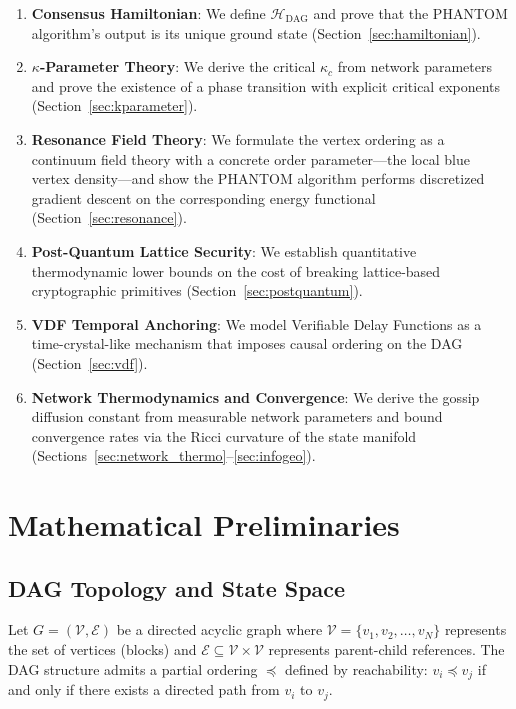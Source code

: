 \documentclass[12pt,a4paper,twocolumn]{article}
\newcommand{\Hdag}{\mathcal{H}_{\mathrm{DAG}}}
\newcommand{\kparam}{\kappa}
\newcommand{\vertexset}{\mathcal{V}}
\newcommand{\edgeset}{\mathcal{E}}
\begin{document}
\begin{enumerate}[leftmargin=*,itemsep=2pt]
\item \textbf{Consensus Hamiltonian}: We define $\Hdag$ and prove that the PHANTOM algorithm's output is its unique ground state (Section~\ref{sec:hamiltonian}).

\item \textbf{$\kparam$-Parameter Theory}: We derive the critical $\kparam_c$ from network parameters and prove the existence of a phase transition with explicit critical exponents (Section~\ref{sec:kparameter}).

\item \textbf{Resonance Field Theory}: We formulate the vertex ordering as a continuum field theory with a concrete order parameter---the local blue vertex density---and show the PHANTOM algorithm performs discretized gradient descent on the corresponding energy functional (Section~\ref{sec:resonance}).

\item \textbf{Post-Quantum Lattice Security}: We establish quantitative thermodynamic lower bounds on the cost of breaking lattice-based cryptographic primitives (Section~\ref{sec:postquantum}).

\item \textbf{VDF Temporal Anchoring}: We model Verifiable Delay Functions as a time-crystal-like mechanism that imposes causal ordering on the DAG (Section~\ref{sec:vdf}).

\item \textbf{Network Thermodynamics and Convergence}: We derive the gossip diffusion constant from measurable network parameters and bound convergence rates via the Ricci curvature of the state manifold (Sections~\ref{sec:network_thermo}--\ref{sec:infogeo}).
\end{enumerate}

\section{Mathematical Preliminaries}
\label{sec:prelim}

\subsection{DAG Topology and State Space}

Let $G = (\vertexset, \edgeset)$ be a directed acyclic graph where $\vertexset = \{v_1, v_2, \ldots, v_N\}$ represents the set of vertices (blocks) and $\edgeset \subseteq \vertexset \times \vertexset$ represents parent-child references. The DAG structure admits a partial ordering $\preceq$ defined by reachability: $v_i \preceq v_j$ if and only if there exists a directed path from $v_i$ to $v_j$.
\end{document}
